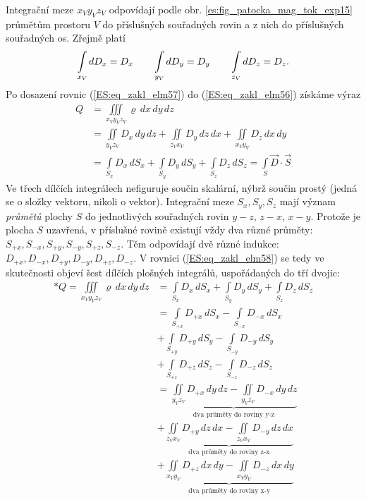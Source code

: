       Integrační meze \(x_Vy_Vz_V\) odpovídají podle obr. \ref{es:fig_patocka_mag_tok_exp15} 
      průmětům prostoru \(V\) do příslušných souřadných rovin a z nich do příslušných souřadných 
      os. Zřejmě platí
      \begin{equation}\label{ES:eq_zakl_elm57}
        \limitint_{\mathclap{x_V}}dD_x = D_x \qquad
        \limitint_{\mathclap{y_V}}dD_y = D_y \qquad
        \limitint_{\mathclap{z_V}}dD_z = D_z.
      \end{equation}
      Po dosazení rovnic (\ref{ES:eq_zakl_elm57}) do (\ref{ES:eq_zakl_elm56}) získáme výraz
      \begin{align}\label{ES:eq_zakl_elm58}
        Q &= \iiint\limits_{x_Vy_Vz_V}\varrho\,dx\,dy\,dz   \nonumber\\ 
          &= \iint\limits_{y_Vz_V}D_x\,dy\,dz + 
             \iint\limits_{z_Vx_V}D_y\,dz\,dx + 
             \iint\limits_{x_Vy_V}D_z\,dx\,dy               \nonumber\\ 
          &= \int\limits_{S_x}D_x\,dS_x + 
             \int\limits_{S_y}D_y\,dS_y + 
             \int\limits_{S_z}D_z\,dS_z =  \int\limits_{S}\vec{D}\cdot\vec{S}
      \end{align}
      Ve třech dílčích integrálech nefiguruje součin skalární, nýbrž součin prostý (jedná se o 
      složky vektoru, nikoli o vektor). Integrační meze \(S_x, S_y, S_z\) mají význam 
      \emph{průmětů} plochy \(S\) do jednotlivých souřadných rovin \(y-z\), \(z-x\), \(x-y\). 
      Protože je plocha \(S\) uzavřená, v příslušné rovině existují vždy dva různé průměty: 
      \(S_{+x}, S_{-x}, S_{+y}, S_{-y}, S_{+z}, S_{-z}\). Těm odpovídají dvě různé indukce: 
      \(D_{+x}, D_{-x}, D_{+y}, D_{-y}, D_{+z}, D_{-z}\). V rovnici (\ref{ES:eq_zakl_elm58}) se 
      tedy ve skutečnosti objeví šest dílčích plošných integrálů, uspořádaných do tří dvojic:
      \begin{align*}   *\label{ES:eq_zakl_elm59}
        Q  = \iiint\limits_{x_Vy_Vz_V}\varrho\,dx\,dy\,dz   
          &= \int\limits_{S_x}D_x\,dS_x + 
             \int\limits_{S_y}D_y\,dS_y + 
             \int\limits_{S_z}D_z\,dS_z                                                \\
          &= \int\limits_{S_{+x}}D_{+x}\,dS_x - \int\limits_{S_{-x}}D_{-x}\,dS_x       \\
          &+ \int\limits_{S_{+y}}D_{+y}\,dS_y - \int\limits_{S_{-y}}D_{-y}\,dS_y       \\
          &+ \int\limits_{S_{+z}}D_{+z}\,dS_z - \int\limits_{S_{-z}}D_{-z}\,dS_z       \\
          &= \underbrace{\iint\limits_{y_Vz_V}D_{+x}\,dy\,dz 
           - \iint\limits_{y_Vz_V}D_{-x}\,dy\,dz}_{\text{dva průměty do roviny y-z}}   \\
          &+ \underbrace{\iint\limits_{z_Vx_V}D_{+y}\,dz\,dx 
           - \iint\limits_{z_Vx_V}D_{-y}\,dz\,dx}_{\text{dva průměty do roviny z-x}}   \\
          &+ \underbrace{\iint\limits_{x_Vy_V}D_{+z}\,dx\,dy 
           - \iint\limits_{x_Vy_V}D_{-z}\,dx\,dy}_{\text{dva průměty do roviny x-y}}
      \end{align*}
